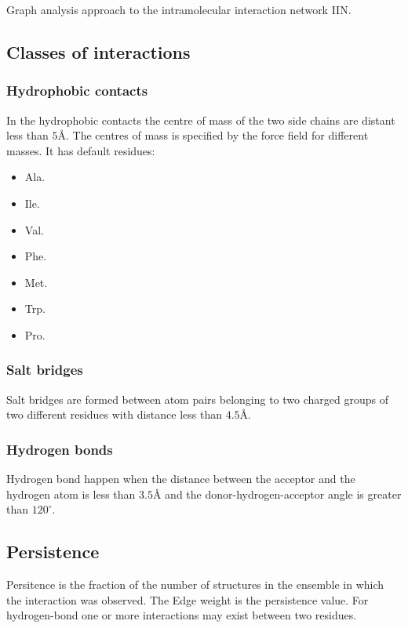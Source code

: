 	Graph analysis approach to the intramolecular interaction network IIN.

	\subsection{Classes of interactions}

		\subsubsection{Hydrophobic contacts}
		In the hydrophobic contacts the centre of mass of the two side chains are distant less than $5\si{\angstrom}$.
		The centres of mass is specified by the force field for different masses.
		It has default residues:

		\begin{multicols}{4}
			\begin{itemize}
				\item Ala.
				\item Ile.
				\item Val.
				\item Phe.
				\item Met.
				\item Trp.
				\item Pro.
			\end{itemize}
		\end{multicols}

		\subsubsection{Salt bridges}
		Salt bridges are formed between atom pairs belonging to two charged groups of two different residues with distance less than $4.5\si{\angstrom}$.

		\subsubsection{Hydrogen bonds}
		Hydrogen bond happen when the distance between the acceptor and the hydrogen atom is less than $3.5\si{\angstrom}$ and the donor-hydrogen-acceptor angle is greater than $120^\circ$.

	\subsection{Persistence}
	Persitence is the fraction of the number of structures in the ensemble in which the interaction was observed.
	The Edge weight is the persistence value.
	For hydrogen-bond one or more interactions may exist between two residues.

